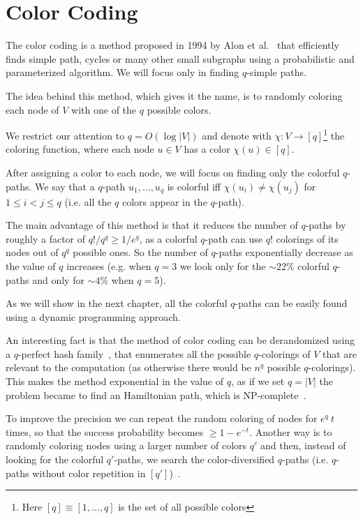 \section{Color Coding}

The color coding is a method proposed in 1994 by Alon et al.~\cite{Alon:1995:COL:210332.210337} that efficiently finds simple path, cycles or many other small subgraphs using a probabilistic and parameterized algorithm. We will focus only in finding $q$-simple paths.\medskip

The idea behind this method, which gives it the name, is to randomly coloring each node of $V$ with one of the $q$ possible colors.

We restrict our attention to $q = O(\log |V|)$ and denote with $\chi : V \rightarrow [q]$\footnote{Here $[q] \equiv [1, \ldots, q]$ is the set of all possible colors} the coloring function, where each node $u \in V$ has a color $\chi(u) \in [q]$.\medskip

After assigning a color to each node, we will focus on finding only the colorful $q$-paths. We say that a $q$-path $u_{1}, \ldots, u_{q}$ is colorful iff $\chi(u_{i}) \neq \chi(u_{j})$ for $1 \leq i < j \leq q$ (i.e. all the $q$ colors appear in the $q$-path).\medskip

The main advantage of this method is that it reduces the number of $q$-paths by roughly a factor of $q! / q^{q} \geq 1/e^{q}$, as a colorful $q$-path can use $q!$ colorings of its nodes out of $q^{q}$ possible ones. So the number of $q$-paths exponentially decrease as the value of $q$ increases (e.g. when $q = 3$ we look only for the $\sim22\%$ colorful $q$-paths and only for $\sim4\%$ when $q = 5$).\bigskip

As we will show in the next chapter, all the colorful $q$-paths can be easily found using a dynamic programming approach.\medskip

An interesting fact is that the method of color coding can be derandomized using a $q$-perfect hash family~\cite{Alon:1995:COL:210332.210337}, that enumerates all the possible $q$-colorings of $V$ that are relevant to the computation (as otherwise there would be $n^q$ possible $q$-colorings).
This makes the method exponential in the value of $q$, as if we set $q = |V|$ the problem became to find an Hamiltonian path, which is NP-complete~\cite{GareyJohnson:1979}.\medskip

To improve the precision we can repeat the random coloring of nodes for $e^{q}\ t$ times, 
so that the success probability becomes $\geq 1-e^{-t}$. 
Another way is to randomly coloring nodes using a larger number of colors $q'$ and then, instead of looking for the colorful $q'$-paths,
we search the color-diversified $q$-paths (i.e. $q$-paths without color repetition in $[q']$)~\cite{deshpande2007randomized}.\medskip

